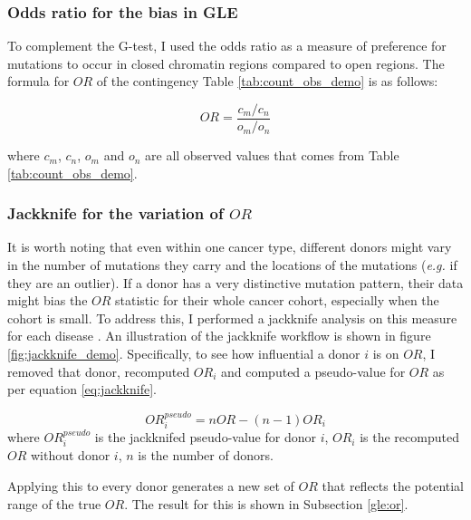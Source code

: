

\subsubsection{Odds ratio for the bias in GLE}
To complement the G-test, I used the odds ratio \citep[$OR$;][]{Hoppe2017OddsRatios} as a measure of preference for mutations to occur in closed chromatin regions compared to open regions. The formula for $OR$ of the contingency Table \ref{tab:count_obs_demo} is as follows:

\begin{equation}
    OR = \frac{c_m/c_n}{o_m/o_n}
    \label{eq:or}
\end{equation}

where $c_m$, $c_n$, $o_m$ and $o_n$ are all observed values that comes from Table \ref{tab:count_obs_demo}.

\subsubsection{Jackknife for the variation of $OR$}
It is worth noting that even within one cancer type, different donors might vary in the number of mutations they carry and the locations of the mutations (\textit{e.g.} if they are an outlier). If a donor has a very distinctive mutation pattern, their data might bias the $OR$ statistic for their whole cancer cohort, especially when the cohort is small. To address this, I performed a jackknife analysis on this measure for each disease \citep{Miller1974TheReview}. An illustration of the jackknife workflow is shown in figure \ref{fig:jackknife_demo}. Specifically, to see how influential a donor $i$ is on $OR$, I removed that donor, recomputed $OR_i$ and computed a pseudo-value for $OR$ as per equation \ref{eq:jackknife}. 

\begin{equation}
    OR^{pseudo}_i = nOR - (n-1)OR_i
    \label{eq:jackknife}
\end{equation}
where $OR^{pseudo}_i$ is the jackknifed pseudo-value for donor $i$, $OR_i$ is the recomputed $OR$ without donor $i$, $n$ is the number of donors.

Applying this to every donor generates a new set of $OR$ that reflects the potential range of the true $OR$. The result for this is shown in Subsection \ref{gle:or}.



